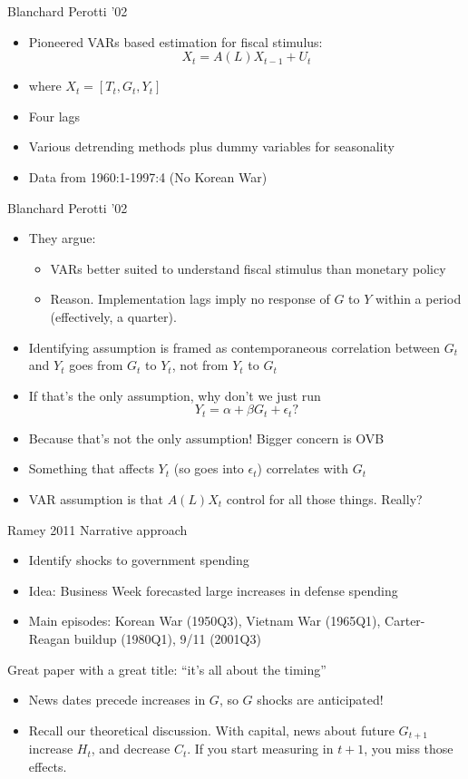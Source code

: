 \documentclass[11pt,aspectratio=169,xcolor={dvipsnames},hyperref={pdftex,pdfpagemode=UseNone,hidelinks,pdfdisplaydoctitle=true},usepdftitle=false]{beamer}
\begin{document}
\begin{frame}{Blanchard Perotti '02}
\begin{itemize}
\item Pioneered VARs based estimation for fiscal stimulus:
$$X_t = A(L)X_{t-1} + U_t$$
\item where $X_t = [T_t, G_t, Y_t]$
\item Four lags
\item Various detrending methods plus dummy variables for seasonality
\item Data from 1960:1-1997:4 (No Korean War)
\end{itemize}
\end{frame}

\begin{frame}{Blanchard Perotti '02}
\begin{itemize}
\item They argue:
\begin{itemize}
\item VARs better suited to understand fiscal stimulus than monetary policy
\item Reason. Implementation lags imply no response of $G$ to $Y$ within a period (effectively, a quarter).
\end{itemize}
\item Identifying assumption is framed as contemporaneous correlation between $G_t$ and $Y_t$ goes from $G_t$ to $Y_t$, not from $Y_t$ to $G_t$
\item If that's the only assumption, why don't we just run
$$Y_{t} = \alpha + \beta G_t + \epsilon_{t} ?$$
\item Because that's not the only assumption! Bigger concern is OVB
\item Something that affects $Y_{t}$ (so goes into $\epsilon_{t}$) correlates with $G_t$
\item VAR assumption is that $A(L)X_t$ control for all those things. Really?
\end{itemize}
\end{frame}

\begin{frame}{Ramey 2011}
Narrative approach
\begin{itemize}
\item Identify shocks to government spending
\item Idea: Business Week forecasted large increases in defense spending
\item Main episodes: Korean War (1950Q3), Vietnam War (1965Q1), Carter-Reagan buildup (1980Q1), 9/11 (2001Q3)
\end{itemize}
Great paper with a great title: ``it's all about the timing''
\begin{itemize}
\item News dates precede increases in $G$, so $G$ shocks are anticipated! 
\item Recall our theoretical discussion. With capital, news about future $G_{t+1}$ increase $H_{t}$, and decrease $C_{t}$. If you start measuring in $t+1$, you miss those effects.
\end{itemize}
\end{frame}
\end{document}
